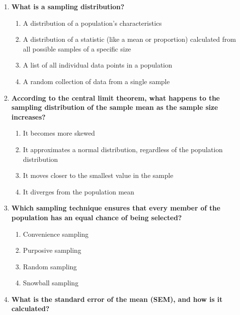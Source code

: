 \documentclass[
  letterpaper,
  DIV=11,
  numbers=noendperiod]{scrreprt}
\begin{document}
\begin{enumerate}
\def\labelenumi{\arabic{enumi}.}
\item
  \textbf{What is a sampling distribution?}

  \begin{enumerate}
  \def\labelenumii{\alph{enumii}.}
  \item
    A distribution of a population's characteristics
  \item
    A distribution of a statistic (like a mean or proportion) calculated
    from all possible samples of a specific size
  \item
    A list of all individual data points in a population
  \item
    A random collection of data from a single sample
  \end{enumerate}
\item
  \textbf{According to the central limit theorem, what happens to the
  sampling distribution of the sample mean as the sample size
  increases?}

  \begin{enumerate}
  \def\labelenumii{\alph{enumii}.}
  \item
    It becomes more skewed
  \item
    It approximates a normal distribution, regardless of the population
    distribution
  \item
    It moves closer to the smallest value in the sample
  \item
    It diverges from the population mean
  \end{enumerate}
\item
  \textbf{Which sampling technique ensures that every member of the
  population has an equal chance of being selected?}

  \begin{enumerate}
  \def\labelenumii{\alph{enumii}.}
  \item
    Convenience sampling
  \item
    Purposive sampling
  \item
    Random sampling
  \item
    Snowball sampling
  \end{enumerate}
\item
  \textbf{What is the standard error of the mean (SEM), and how is it
  calculated?}


\end{enumerate}
\end{document}
